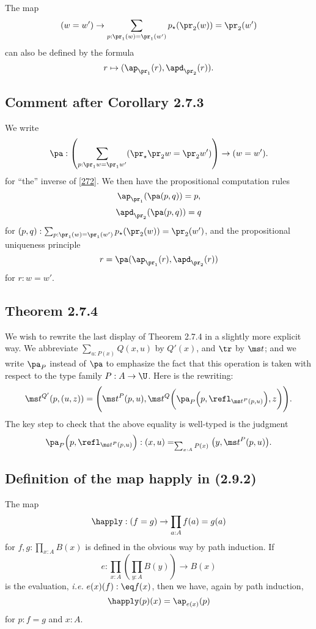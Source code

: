 \documentclass[12pt]{article}
\begin{document}
The map 
\begin{equation}\label{272}
(w=w')\to\sum_{p:\pr_1(w)=\pr_1(w')}p_\star(\pr_2(w))=\pr_2(w')
\end{equation}
can also be defined by the formula 
$$
r\mapsto(\ap_{\pr_1}(r),\apd_{\pr_2}(r)).
$$ 


\subsection{Comment after Corollary 2.7.3}

We write 
$$
\pa:\left(\sum_{p:\pr_1w=\pr_1w'}(\pr_\star\pr_2w=\pr_2w')\right)\to(w=w').
$$ 
for ``the'' inverse of \eqref{272}. We then have the propositional computation rules 
$$
\ap_{\pr_1}(\pa(p,q))=p,
$$
$$
\apd_{\pr_2}(\pa(p,q))=q
$$
for $(p,q):\sum_{p:\pr_1(w)=\pr_1(w')}p_\star(\pr_2(w))=\pr_2(w')$, and the propositional uniqueness principle 
$$
r=\pa(\ap_{\pr_1}(r),\apd_{\pr_2}(r))
$$ 
for $r:w=w'$.


\subsection{Theorem 2.7.4}\label{274}

We wish to rewrite the last display of Theorem 2.7.4 in a slightly more explicit way. We abbreviate $\sum_{u:P(x)}Q(x,u)$ by $Q'(x)$, and $\tr$ by $\ms t$; and we write $\pa_P$ instead of $\pa$ to emphasize the fact that this operation is taken with respect to the type family $P:A\to\U$. Here is the rewriting:
$$
\ms t^{Q'}(p,(u,z))=\Bigg(\ms t^P(p,u),\ms t^Q\bigg(\pa_P\Big(p,\refl_{\ms t^P(p,u)}\Big),z\bigg)\Bigg).
$$ 
The key step to check that the above equality is well-typed is the judgment 
$$
\pa_P\Big(p,\refl_{\ms t^P(p,u)}\Big):(x,u)=_{\sum_{x:A}P(x)}\big(y,\ms t^P(p,u)\big).
$$ 


\subsection{Definition of the map \textsf{happly} in (2.9.2)}

The map 
$$
\happly:(f=g)\to\prod_{a:A}f(a)=g(a)
$$ 
for $f,g:\prod_{x:A}B(x)$ is defined in the obvious way by path induction. If 
$$
e:\prod_{x:A}\left(\prod_{y:A}B(y)\right)\to B(x)
$$ 
is the evaluation, \emph{i.e.} $e(x)(f):\eq f(x)$, then we have, again by path induction, 
$$
\happly(p)(x)=\ap_{e(x)}(p)
$$ 
for $p:f=g$ and $x:A$. 
\end{document}
